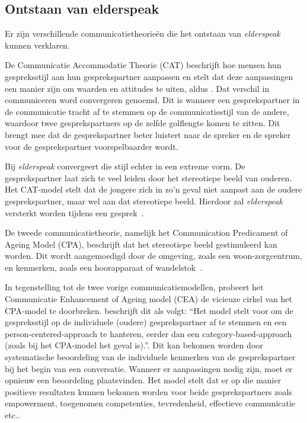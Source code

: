 \subsection{Ontstaan van elderspeak}
Er zijn verschillende communicatietheorieën die het ontstaan van \textit{elderspeak} kunnen verklaren.

De Communicatie Accommodatie Theorie (CAT) beschrijft hoe mensen hun gespreksstijl aan hun gesprekspartner aanpassen en stelt dat deze aanpassingen een manier zijn om waarden en attitudes te uiten, aldus \textcite{Campens2021}. Dat verschil in communiceren word convergeren genoemd. Dit is wanneer een gesprekspartner in de communicatie tracht af te stemmen op de communicatiestijl van de andere, waardoor twee gesprekspartners op de zelfde golflengte komen te zitten. Dit brengt mee dat de gesprekspartner beter luistert naar de spreker en de spreker voor de gesprekspartner voorspelbaarder wordt.

Bij \textit{elderspeak} convergeert die stijl echter in een extreme vorm. De gesprekspartner laat zich te veel leiden door het stereotiepe beeld van ouderen. Het CAT-model stelt dat de jongere zich in zo’n geval niet aanpast aan de oudere gesprekspartner, maar wel aan dat stereotiepe beeld. Hierdoor zal \textit{elderspeak} versterkt worden tijdens een gesprek~\autocite{Hehman2015}.

De tweede communicatietheorie, namelijk het Communication Predicament of Ageing Model (CPA), beschrijft dat het stereotiepe beeld gestimuleerd kan worden. Dit wordt aangemoedigd door de omgeving, zoals een woon-zorgcentrum, en kenmerken, zoals een hoorapparaat of wandelstok~\autocite{Hehman2015}.

In tegenstelling tot de twee vorige communicatiemodellen, probeert het Communicatie Enhancement of Ageing model (CEA) de vicieuze cirkel van het CPA-model te doorbreken. \textcite{Campens2021} beschrijft dit als volgt: ``Het model stelt voor om de gespreksstijl op de individuele (oudere) gesprekspartner af te stemmen en een person-centered-approach te hanteren, eerder dan een category-based-approach (zoals bij het CPA-model het geval is).''. Dit kan bekomen worden door systematische beoordeling van de individuele kenmerken van de gesprekspartner bij het begin van een conversatie. Wanneer er aanpassingen nodig zijn, moet er opnieuw een beoordeling plaatsvinden. Het model stelt dat er op die manier positieve resultaten kunnen bekomen worden voor beide gesprekspartners zoals empowerment, toegenomen competenties, tevredenheid, effectieve communicatie etc.\~\autocite{Hehman2015}.

